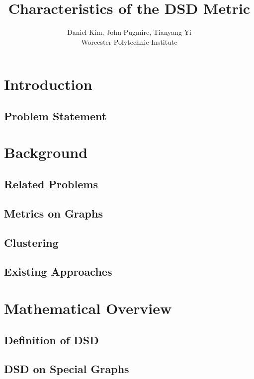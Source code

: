 \documentclass[11pt,oneside]{report}
\theoremstyle{definition}
\begin{document}
\title{Characteristics of the DSD Metric}
\author{Daniel Kim, John Pugmire, Tianyang Yi\\Worcester Polytechnic Institute\\}
\maketitle
\tableofcontents


\chapter{Introduction}

\section{Problem Statement}

\chapter{Background}

\section{Related Problems}

\section{Metrics on Graphs}

\section{Clustering}

\section{Existing Approaches}


\chapter{Mathematical Overview}
\section{Definition of DSD}


\section{DSD on Special Graphs}
\end{document}
